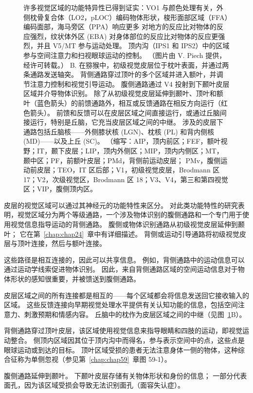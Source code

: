 \begin{figure}[htbp]
{		许多视觉区域的功能特异性已得到证实：VO1 与颜色处理有关，外侧枕骨复合体（LO2，pLOC）编码物体形状，梭形面部区域（FFA）编码面部，海马旁区（PPA）响应更多 对地方的反应比对物体的反应强烈，纹状体外区 (EBA) 对身体部位的反应比对物体的反应更强烈，并且 V5/MT 参与运动处理。
		顶内沟（IPS1 和 IPS2）中的区域参与空间注意力和扫视眼球运动的控制。 （图片由 V. Piech 提供，经许可转载。）
		B. 在猕猴中，初级视觉皮层位于枕叶表面，并通过两条通路发送轴突。
		背侧通路穿过顶叶的多个区域并进入额叶，并调节注意力控制和视觉引导运动。
		腹侧通路通过 V4 投射到下颞叶皮层区域并介导物体识别。
		除了从初级视觉皮层延伸到颞叶、顶叶和额叶（蓝色箭头）的前馈通路外，相互或反馈通路在相反方向运行（红色箭头）。
		前馈和反馈可以在皮层区域之间直接运行，或通过丘脑间接运行，特别是丘脑，它充当皮层区域之间的中继。 
		涉及的皮层下通路包括丘脑核——外侧膝状核 (LGN)、枕核 (PL) 和背内侧核 (MD)——以及上丘 (SC)。 （缩写：AIP，顶内前区；FEF，额叶视野；IT，颞下皮层；LIP，顶内外侧区；MIP，顶内内侧区；MT，颞中区；PF，前额叶皮层；PMd，背侧前运动皮层； PMv，腹侧运动前皮层；TEO，IT 区后部；V1，初级视觉皮层，Brodmann 区 17；V2，次级视觉区，Brodmann 区 18；V3、V4，第三和第四视觉区；VIP，腹侧顶内区。 }
	\label{fig:21_7}
\end{figure}


皮层的视觉区域可以通过其神经元的功能特性来区分。
对此类功能特性的研究表明，视觉区域分为两个等级通路，一个涉及物体识别的腹侧通路和一个专门用于使用视觉信息指导运动的背侧通路。
腹侧或物体识别通路从初级视觉皮层延伸到颞叶；
它在第~\ref{chap:chap24}~章中有详细描述。
背侧或运动引导通路将初级视觉皮层与顶叶连接，然后与额叶连接。


这些路径是相互连接的，因此可以共享信息。
例如，背侧通路中的运动信息可以通过运动学线索促进物体识别。
因此，来自背侧通路区域的空间运动信息对于物体形状的感知很重要，并被馈送到腹侧通路。


皮层区域之间的所有连接都是相互的——每个区域都会将信息发送回它接收输入的区域。
这些反馈连接向早期视觉处理水平提供有关认知功能的信息，包括空间注意力、刺激预期和情感内容。
丘脑中的枕作为皮层区域之间的中继（见图~\ref{fig:21_7}B）。


背侧通路穿过顶叶皮层，该区域使用视觉信息来指导眼睛和四肢的运动，即视觉运动整合。
侧顶内区域因其位于顶内沟中而得名，参与表示空间中的点，这些点是眼球运动或到达的目标。
顶叶区域受损的患者无法注意身体一侧的物体，这种综合征称为单侧忽视（参见第~\ref{chap:chap59}~章图 59-1）。


腹侧通路延伸到颞叶。
下颞叶皮层存储有关物体形状和身份的信息；
一部分代表面孔，因为该区域受损会导致无法识别面孔（面容失认症）。


